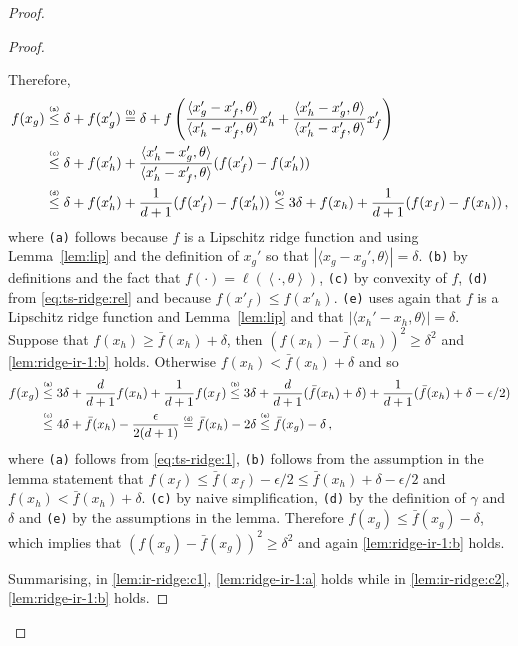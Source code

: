 \documentclass[letter, 12pt]{report}
\newcommand{\explan}[1]{\stackrel{\text{\tiny \texttt{#1}}}}
\newcommand{\ip}[1]{\left \langle #1 \right \rangle}
\newcommand{\sip}[1]{\langle #1 \rangle}
\newcommand{\1}{\mathbf{1}}
\theoremstyle{plain}
\theoremstyle{definition}
\theoremstyle{remark}
\begin{document}
\begin{proof}
\begin{proof}
\begin{enumcases}
            Therefore,
            \begin{align}
                f(x_g)
                 & \explan{(a)}\leq \delta + f(x_g')                                                                                 \nonumber
                \explan{(b)}= \delta + f\left(\frac{\sip{x_g' - x_f', \theta}}{\sip{x_h' - x_f', \theta}} x_h' + \frac{\sip{x_h' - x_g', \theta}}{\sip{x_h' - x_f',\theta}} x_f'\right) \nonumber \\
                 & \explan{(c)}\leq \delta + f(x_h') + \frac{\sip{x_h' - x_g', \theta}}{\sip{x_h' - x_f', \theta}} (f(x_f') - f(x_h')) \nonumber                                                  \\
                 & \explan{(d)}\leq \delta + f(x_h') + \frac{1}{d+1} (f(x_f') - f(x_h'))
                \explan{(e)}\leq 3 \delta + f(x_h) + \frac{1}{d+1} (f(x_f) - f(x_h)) \,, \label{eq:ts-ridge:1}
            \end{align}
            where \texttt{(a)} follows because $f$ is a Lipschitz ridge function and using Lemma~\ref{lem:lip} and the definition of $x_g'$ so that
            $|\sip{x_g - x_g', \theta}| = \delta$.
            \texttt{(b)} by definitions and the fact that $f(\cdot) = \ell(\ip{\cdot, \theta})$,
            \texttt{(c)} by convexity of $f$,
            \texttt{(d)} from \cref{eq:ts-ridge:rel} and because $f(x'_f) \leq f(x'_h)$.
            \texttt{(e)} uses again that $f$ is a Lipschitz ridge function and Lemma~\ref{lem:lip} and that $|\sip{x_h' - x_h, \theta}| = \delta$.
            Suppose that $f(x_h) \geq \bar f(x_h) + \delta$, then $(f(x_h) - \bar f(x_h))^2 \geq \delta^2$ and \ref{lem:ridge-ir-1:b} holds.
            Otherwise $f(x_h) < \bar f(x_h) + \delta$ and so
            \begin{align*}
                f(x_g)
                 & \explan{(a)}\leq 3 \delta + \frac{d}{d+1} f(x_h) + \frac{1}{d+1} f(x_f)
                \explan{(b)}\leq 3 \delta + \frac{d}{d+1} (\bar f(x_h) + \delta) + \frac{1}{d+1} (\bar f(x_h) + \delta - \epsilon / 2) \\
                 & \explan{(c)}\leq 4 \delta + \bar f(x_h) - \frac{\epsilon}{2(d+1)}
                \explan{(d)}= \bar f(x_h) - 2\delta
                \explan{(e)}\leq \bar f(x_g) - \delta \,,
            \end{align*}
            where \texttt{(a)} follows from \cref{eq:ts-ridge:1},
            \texttt{(b)} follows from the assumption in the lemma statement that $f(x_f) \leq \bar f(x_f) - \epsilon/2 \leq \bar f(x_h) + \delta - \epsilon/2$
            and $f(x_h) < \bar f(x_h) + \delta$.
            \texttt{(c)} by naive simplification,
            \texttt{(d)} by the definition of $\gamma$ and $\delta$
            and \texttt{(e)} by the assumptions in the lemma.
            Therefore $f(x_g) \leq \bar f(x_g) - \delta$,
            which implies that $(f(x_g) - \bar f(x_g))^2 \geq \delta^2$ and again \ref{lem:ridge-ir-1:b} holds.
        \end{enumcases}
        Summarising, in \ref{lem:ir-ridge:c1}, \ref{lem:ridge-ir-1:a} holds while in \ref{lem:ir-ridge:c2}, \ref{lem:ridge-ir-1:b} holds.
    \end{proof}


\end{proof}
\end{document}
